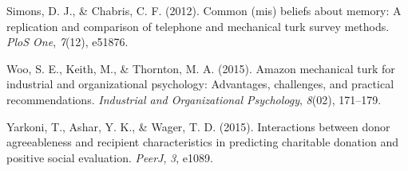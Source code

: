 \documentclass[english,man]{apa6}
\theoremstyle{definition}
\theoremstyle{definition}
\theoremstyle{remark}
\begin{document}
\hypertarget{ref-simons2012common}{}
Simons, D. J., \& Chabris, C. F. (2012). Common (mis) beliefs about
memory: A replication and comparison of telephone and mechanical turk
survey methods. \emph{PloS One}, \emph{7}(12), e51876.

\hypertarget{ref-woo2015amazon}{}
Woo, S. E., Keith, M., \& Thornton, M. A. (2015). Amazon mechanical turk
for industrial and organizational psychology: Advantages, challenges,
and practical recommendations. \emph{Industrial and Organizational
Psychology}, \emph{8}(02), 171--179.

\hypertarget{ref-yarkoni2015interactions}{}
Yarkoni, T., Ashar, Y. K., \& Wager, T. D. (2015). Interactions between
donor agreeableness and recipient characteristics in predicting
charitable donation and positive social evaluation. \emph{PeerJ},
\emph{3}, e1089.


\clearpage
\renewcommand{\listtablename}{Table captions}
\listoftables
\end{document}
